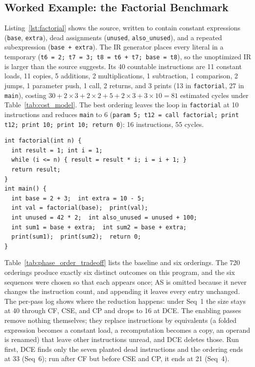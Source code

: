 \documentclass[conference,a4paper]{IEEEtran}
\begin{document}
\subsection{Worked Example: the Factorial Benchmark}
\label{sec:factorial}
Listing~\ref{lst:factorial} shows the source, written to contain constant expressions (\texttt{base}, \texttt{extra}), dead assignments (\texttt{unused}, \texttt{also\_unused}), and a repeated subexpression (\texttt{base + extra}). The IR generator places every literal in a temporary (\texttt{t6 = 2; t7 = 3; t8 = t6 + t7; base = t8}), so the unoptimized IR is larger than the source suggests. Its 40 countable instructions are 11 constant loads, 11 copies, 5 additions, 2 multiplications, 1 subtraction, 1 comparison, 2 jumps, 1 parameter push, 1 call, 2 returns, and 3 prints (13 in \texttt{factorial}, 27 in \texttt{main}), costing $30 + 2 \times 3 + 2 \times 2 + 5 + 2 \times 3 + 3 \times 10 = 81$ estimated cycles under Table~\ref{tab:cost_model}. The best ordering leaves the loop in \texttt{factorial} at 10 instructions and reduces \texttt{main} to 6 (\texttt{param 5; t12 = call factorial; print t12; print 10; print 10; return 0}): 16 instructions, 55 cycles.

\begin{lstlisting}[caption={The \texttt{factorial} benchmark (comments removed).},label={lst:factorial}]
int factorial(int n) {
  int result = 1; int i = 1;
  while (i <= n) { result = result * i; i = i + 1; }
  return result;
}
int main() {
  int base = 2 + 3;  int extra = 10 - 5;
  int val = factorial(base);  print(val);
  int unused = 42 * 2;  int also_unused = unused + 100;
  int sum1 = base + extra;  int sum2 = base + extra;
  print(sum1);  print(sum2);  return 0;
}
\end{lstlisting}

Table~\ref{tab:phase_order_tradeoff} lists the baseline and six orderings. The 720 orderings produce exactly six distinct outcomes on this program, and the six sequences were chosen so that each appears once; AS is omitted because it never changes the instruction count, and appending it leaves every entry unchanged. The per-pass log shows where the reduction happens: under Seq~1 the size stays at 40 through CF, CSE, and CP and drops to 16 at DCE. The enabling passes remove nothing themselves; they replace instructions by equivalents (a folded expression becomes a constant load, a recomputation becomes a copy, an operand is renamed) that leave other instructions unread, and DCE deletes those. Run first, DCE finds only the seven planted dead instructions and the ordering ends at 33 (Seq~6); run after CF but before CSE and CP, it ends at 21 (Seq~4).
\end{document}
